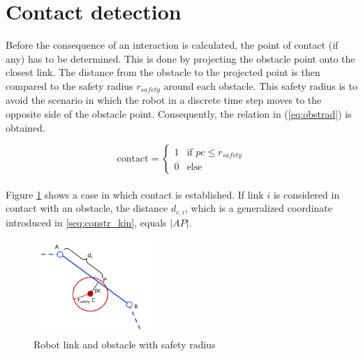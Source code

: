 \section{Contact detection}

Before the consequence of an interaction is calculated, the point of contact (if any) has to be determined. This is done by projecting the obstacle point onto the closest link. The distance from the obstacle to the projected point is then compared to the safety radius $r_{safety}$ around each obstacle. This safety radius is to avoid the scenario in which the robot in a discrete time step moves to the opposite side of the obstacle point. Consequently, the relation in (\ref{eq:obstrad}) is obtained. 

\begin{equation}\label{eq:obstrad}
    \text{contact} =
    \begin{cases}
        1 & \text{if $pc \leq r_{safety}$}\\
        0 & \text{else}
    \end{cases}
\end{equation}
\\
Figure \ref{fig:obstrad} shows a case in which contact is established. If link $i$ is considered in contact with an obstacle, the distance $d_{c,i}$, which is a generalized coordinate introduced in \ref{seq:constr_kin}, equals $|AP|$.

\begin{figure}
    \centering
    \includegraphics[trim=1cm 1cm 1.2cm 0.6cm, clip=true, width=0.4\textwidth]{figures/obst_radius.PNG}
    \caption{Robot link and obstacle with safety radius}
    \label{fig:obstrad}
\end{figure}


